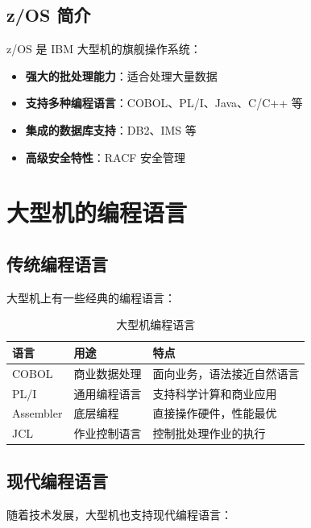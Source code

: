 \documentclass[12pt,UTF8]{ctexbook}
\begin{document}
\section{z/OS 简介}

z/OS 是 IBM 大型机的旗舰操作系统：

\begin{itemize}[leftmargin=2cm]
    \item \textbf{强大的批处理能力}：适合处理大量数据
    \item \textbf{支持多种编程语言}：COBOL、PL/I、Java、C/C++ 等
    \item \textbf{集成的数据库支持}：DB2、IMS 等
    \item \textbf{高级安全特性}：RACF 安全管理
\end{itemize}

\chapter{大型机的编程语言}
\label{chap:programming}

\section{传统编程语言}

大型机上有一些经典的编程语言：

\begin{table}[htbp]
    \centering
    \caption{大型机编程语言}
    \begin{tabular}{|p{3cm}|p{3cm}|p{4cm}|}
        \hline
        \textbf{语言} & \textbf{用途} & \textbf{特点} \\
        \hline
        COBOL & 商业数据处理 & 面向业务，语法接近自然语言 \\
        \hline
        PL/I & 通用编程语言 & 支持科学计算和商业应用 \\
        \hline
        Assembler & 底层编程 & 直接操作硬件，性能最优 \\
        \hline
        JCL & 作业控制语言 & 控制批处理作业的执行 \\
        \hline
    \end{tabular}
\end{table}

\section{现代编程语言}

随着技术发展，大型机也支持现代编程语言：
\end{document}
